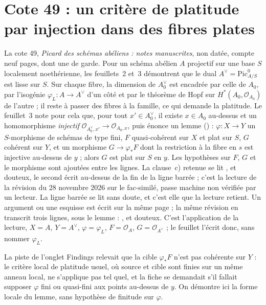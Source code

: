 \section[Cote 49 : un critère de platitude par injection dans des fibres plates]{Cote 49 : un critère de platitude par injection dans des fibres plates\protect{}}\label{sec:49}

La cote 49, \emph{Picard des schémas abéliens : notes manuscrites}, non datée, compte neuf pages, dont une de garde. Pour un schéma abélien $A$ projectif sur une base $S$ localement noethérienne, les feuillets~2 et~3 démontrent que le dual $A^\vee = \mathrm{Pic}^0_{A/S}$ est lisse sur $S$. Sur chaque fibre, la dimension de $A^\vee_0$ est encadrée par celle de $A_0$, par l'isogénie $\varphi_L : A \to A^\vee$ d'un côté et par le théorème de Hopf sur $H^*(A_0, \mathcal O_{A_0})$ de l'autre ; il reste à passer des fibres à la famille, ce qui demande la platitude. Le feuillet~3 note pour cela que, pour tout $x' \in A^\vee_0$, il existe $x \in A_0$ au-dessus et un homomorphisme \emph{injectif} $\mathcal O_{A^\vee_0, x'} \to \mathcal O_{A_0, x}$, puis énonce un lemme () : $\varphi : X \to Y$ un $S$-morphisme de schémas de type fini, $F$ quasi-cohérent sur $X$ et plat sur $S$, $G$ cohérent sur $Y$, et un morphisme $G \to \varphi_*F$ dont la restriction à la fibre en $s$ est injective au-dessus de $y$ ; alors $G$ est plat sur $S$ en $y$. Les hypothèses sur $F$, $G$ et le morphisme sont ajoutées entre les lignes. La clause~c) retenue se lit ,  et  douteux, le second écrit au-dessus de la fin de la ligne barrée  ; c'est la lecture de la révision du 28 novembre 2026 sur le fac-similé, passe machine non vérifiée par un lecteur. La ligne barrée se lit sans doute, et c'est elle que la lecture retient. Un argument ou une esquisse est écrit sur la même page ; la même révision en transcrit trois lignes, sous le lemme : ,  et  douteux. C'est l'application de la lecture, $X = A$, $Y = A^\vee$, $\varphi = \varphi_L$, $F = \mathcal O_A$, $G = \mathcal O_{A^\vee}$ ; le feuillet l'écrit donc, sans nommer $\varphi_L$.

La piste de l'onglet Findings relevait que la cible $\varphi_*F$ n'est pas cohérente sur $Y$ : le critère local de platitude usuel, où source et cible sont finies sur un même anneau local, ne s'applique pas tel quel, et la fiche se demandait s'il fallait supposer $\varphi$ fini ou quasi-fini aux points au-dessus de $y$. On démontre ici la forme locale du lemme, sans hypothèse de finitude sur $\varphi$.

